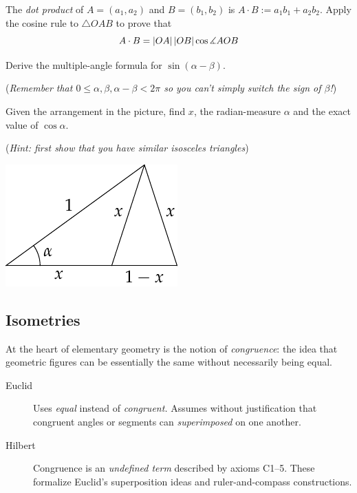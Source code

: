 \begin{exercises}{}{}
\begin{enumerate}
	\item The \emph{dot product} of $A=(a_1,a_2)$ and $B=(b_1,b_2)$ is $A\cdot B:=a_1b_1+a_2b_2$. Apply the cosine rule to $\triangle OAB$ to prove that
	\[A\cdot B=\left| OA\right|\left| OB\right|\cos\measuredangle AOB\]
	
	
	\item Derive the multiple-angle formula for $\sin(\alpha-\beta)$.\par
	(\emph{Remember that $0\le \alpha,\beta, \alpha-\beta<2\pi$ so you can't simply switch the sign of $\beta$!})
	
	
	\begin{minipage}[t]{0.7\linewidth}\vspace{0pt}
	\item Given the arrangement in the picture, find $x$, the radian-measure $\alpha$ and the exact value of $\cos\alpha$.\par
	(\emph{Hint: first show that you have similar isosceles triangles})	
	\end{minipage}\begin{minipage}[t]{0.3\linewidth}\vspace{0pt}
	\flushright\includegraphics{angles-sin36}
	\end{minipage}
\end{enumerate}
\end{exercises}

\clearpage


\subsection{Isometries}\label{sec:klein}

At the heart of elementary geometry is the notion of \emph{congruence}: the idea that geometric figures can be essentially the same without necessarily being equal.
\begin{description}
	\item[Euclid] Uses \emph{equal} instead of \emph{congruent.} Assumes without justification that congruent angles or segments can \emph{superimposed} on one another.
	\item[Hilbert] Congruence is an \emph{undefined term} described by axioms C1--5. These formalize Euclid's superposition ideas and ruler-and-compass constructions.
\end{description}

